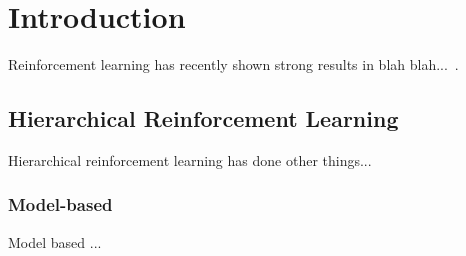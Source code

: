 \section{Introduction}

Reinforcement learning has recently shown strong results in blah blah...~\cite{mnih2015human}.

\subsection{Hierarchical Reinforcement Learning}

Hierarchical reinforcement learning has done other things...

\subsubsection{Model-based}

Model based ...